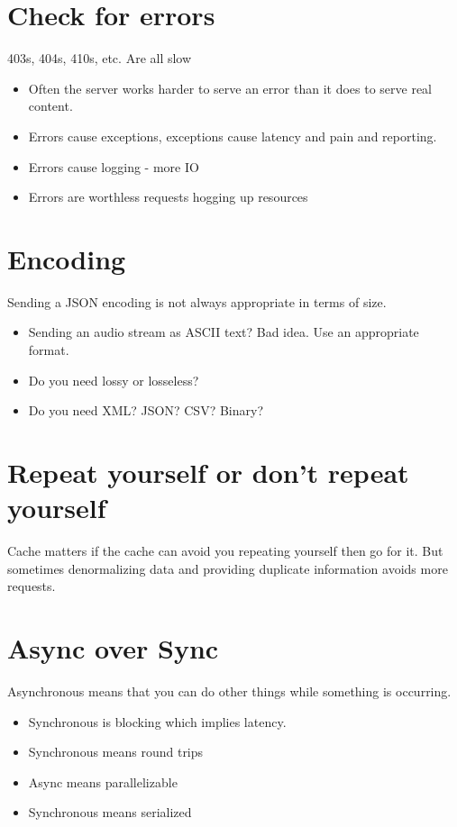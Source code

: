 \documentclass[../CMPUT-404-Notes.tex]{subfiles}
\begin{document}
\section{Check for errors}
403s, 404s, 410s, etc. Are all slow
\begin{itemize}
    \item Often the server works harder to serve an error
    than it does to serve real content.
    \item Errors cause exceptions, exceptions cause latency
    and pain and reporting.
    \item Errors cause logging - more IO
    \item Errors are worthless requests hogging up
    resources
\end{itemize}

\section{Encoding}
Sending a JSON encoding is not always
appropriate in terms of size.
\begin{itemize}
    \item Sending an audio stream as ASCII text? Bad idea. Use an appropriate format.
    \item Do you need lossy or losseless?
    \item Do you need XML? JSON? CSV? Binary?
\end{itemize}

\section{Repeat yourself or don't repeat yourself}
Cache matters if the cache can avoid you
repeating yourself then go for it.
But sometimes denormalizing data and
providing duplicate information avoids more
requests.

\section{Async over Sync}
Asynchronous means that you can do other
things while something is occurring.
\begin{itemize}
    \item Synchronous is blocking which implies latency.
    \item Synchronous means round trips
    \item Async means parallelizable
    \item Synchronous means serialized
\end{itemize}
\end{document}
